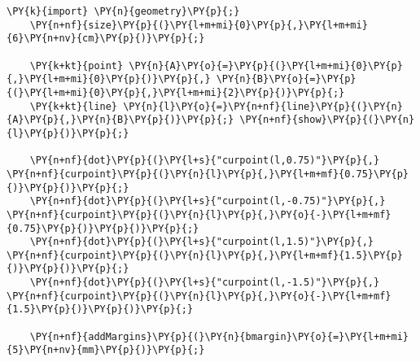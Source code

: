\begin{Verbatim}[commandchars=\\\{\}]
    \PY{k}{import} \PY{n}{geometry}\PY{p}{;}
    \PY{n+nf}{size}\PY{p}{(}\PY{l+m+mi}{0}\PY{p}{,}\PY{l+m+mi}{6}\PY{n+nv}{cm}\PY{p}{)}\PY{p}{;}

    \PY{k+kt}{point} \PY{n}{A}\PY{o}{=}\PY{p}{(}\PY{l+m+mi}{0}\PY{p}{,}\PY{l+m+mi}{0}\PY{p}{)}\PY{p}{,} \PY{n}{B}\PY{o}{=}\PY{p}{(}\PY{l+m+mi}{0}\PY{p}{,}\PY{l+m+mi}{2}\PY{p}{)}\PY{p}{;}
    \PY{k+kt}{line} \PY{n}{l}\PY{o}{=}\PY{n+nf}{line}\PY{p}{(}\PY{n}{A}\PY{p}{,}\PY{n}{B}\PY{p}{)}\PY{p}{;} \PY{n+nf}{show}\PY{p}{(}\PY{n}{l}\PY{p}{)}\PY{p}{;}

    \PY{n+nf}{dot}\PY{p}{(}\PY{l+s}{"curpoint(l,0.75)"}\PY{p}{,} \PY{n+nf}{curpoint}\PY{p}{(}\PY{n}{l}\PY{p}{,}\PY{l+m+mf}{0.75}\PY{p}{)}\PY{p}{)}\PY{p}{;}
    \PY{n+nf}{dot}\PY{p}{(}\PY{l+s}{"curpoint(l,-0.75)"}\PY{p}{,} \PY{n+nf}{curpoint}\PY{p}{(}\PY{n}{l}\PY{p}{,}\PY{o}{-}\PY{l+m+mf}{0.75}\PY{p}{)}\PY{p}{)}\PY{p}{;}
    \PY{n+nf}{dot}\PY{p}{(}\PY{l+s}{"curpoint(l,1.5)"}\PY{p}{,} \PY{n+nf}{curpoint}\PY{p}{(}\PY{n}{l}\PY{p}{,}\PY{l+m+mf}{1.5}\PY{p}{)}\PY{p}{)}\PY{p}{;}
    \PY{n+nf}{dot}\PY{p}{(}\PY{l+s}{"curpoint(l,-1.5)"}\PY{p}{,} \PY{n+nf}{curpoint}\PY{p}{(}\PY{n}{l}\PY{p}{,}\PY{o}{-}\PY{l+m+mf}{1.5}\PY{p}{)}\PY{p}{)}\PY{p}{;}

    \PY{n+nf}{addMargins}\PY{p}{(}\PY{n}{bmargin}\PY{o}{=}\PY{l+m+mi}{5}\PY{n+nv}{mm}\PY{p}{)}\PY{p}{;}
\end{Verbatim}

